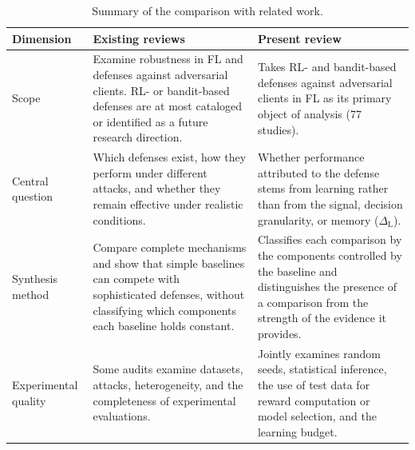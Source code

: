 \begin{table}[!ht]
  \centering
  \caption{Summary of the comparison with related work.}
  \label{tab:revisoes-sintese}
  \footnotesize
  \setlength{\tabcolsep}{3pt}
  \renewcommand{\arraystretch}{1.15}
  \begin{tabularx}{\columnwidth}{@{}
    >{\raggedright\arraybackslash}p{2.1cm}
    >{\raggedright\arraybackslash}X
    >{\raggedright\arraybackslash}X
    @{}}
    \toprule
    Dimension & Existing reviews & Present review \\
    \midrule

    Scope
      & Examine robustness in FL and defenses against adversarial clients. RL- or bandit-based defenses are at most cataloged or identified as a future research direction.
      & Takes RL- and bandit-based defenses against adversarial clients in FL as its primary object of analysis (77 studies). \\

    Central question
      & Which defenses exist, how they perform under different attacks, and whether they remain effective under realistic conditions.
      & Whether performance attributed to the defense stems from learning rather than from the signal, decision granularity, or memory ($\Delta_{\mathrm{L}}$). \\

    Synthesis method
      & Compare complete mechanisms and show that simple baselines can compete with sophisticated defenses, without classifying which components each baseline holds constant.
      & Classifies each comparison by the components controlled by the baseline and distinguishes the presence of a comparison from the strength of the evidence it provides. \\

    Experimental quality
      & Some audits examine datasets, attacks, heterogeneity, and the completeness of experimental evaluations.
      & Jointly examines random seeds, statistical inference, the use of test data for reward computation or model selection, and the learning budget. \\

    \bottomrule
  \end{tabularx}
\end{table}
